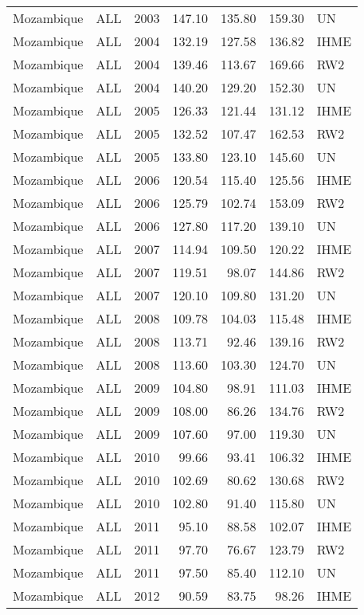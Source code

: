 \begin{longtable}{lllrrrl}
  Mozambique & ALL & 2003 & 147.10 & 135.80 & 159.30 & UN \\ 
  Mozambique & ALL & 2004 & 132.19 & 127.58 & 136.82 & IHME \\ 
  Mozambique & ALL & 2004 & 139.46 & 113.67 & 169.66 & RW2 \\ 
  Mozambique & ALL & 2004 & 140.20 & 129.20 & 152.30 & UN \\ 
  Mozambique & ALL & 2005 & 126.33 & 121.44 & 131.12 & IHME \\ 
  Mozambique & ALL & 2005 & 132.52 & 107.47 & 162.53 & RW2 \\ 
  Mozambique & ALL & 2005 & 133.80 & 123.10 & 145.60 & UN \\ 
  Mozambique & ALL & 2006 & 120.54 & 115.40 & 125.56 & IHME \\ 
  Mozambique & ALL & 2006 & 125.79 & 102.74 & 153.09 & RW2 \\ 
  Mozambique & ALL & 2006 & 127.80 & 117.20 & 139.10 & UN \\ 
  Mozambique & ALL & 2007 & 114.94 & 109.50 & 120.22 & IHME \\ 
  Mozambique & ALL & 2007 & 119.51 & 98.07 & 144.86 & RW2 \\ 
  Mozambique & ALL & 2007 & 120.10 & 109.80 & 131.20 & UN \\ 
  Mozambique & ALL & 2008 & 109.78 & 104.03 & 115.48 & IHME \\ 
  Mozambique & ALL & 2008 & 113.71 & 92.46 & 139.16 & RW2 \\ 
  Mozambique & ALL & 2008 & 113.60 & 103.30 & 124.70 & UN \\ 
  Mozambique & ALL & 2009 & 104.80 & 98.91 & 111.03 & IHME \\ 
  Mozambique & ALL & 2009 & 108.00 & 86.26 & 134.76 & RW2 \\ 
  Mozambique & ALL & 2009 & 107.60 & 97.00 & 119.30 & UN \\ 
  Mozambique & ALL & 2010 & 99.66 & 93.41 & 106.32 & IHME \\ 
  Mozambique & ALL & 2010 & 102.69 & 80.62 & 130.68 & RW2 \\ 
  Mozambique & ALL & 2010 & 102.80 & 91.40 & 115.80 & UN \\ 
  Mozambique & ALL & 2011 & 95.10 & 88.58 & 102.07 & IHME \\ 
  Mozambique & ALL & 2011 & 97.70 & 76.67 & 123.79 & RW2 \\ 
  Mozambique & ALL & 2011 & 97.50 & 85.40 & 112.10 & UN \\ 
  Mozambique & ALL & 2012 & 90.59 & 83.75 & 98.26 & IHME \\ 

\end{longtable}
